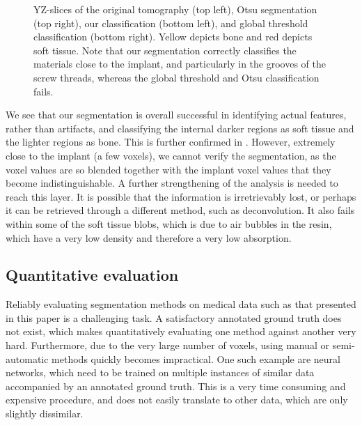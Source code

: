 \begin{figure}
\begin{tabular}{cc}
    \end{tabular}
    \caption{
	YZ-slices of the original tomography (top left), Otsu segmentation (top
	right), our classification (bottom left), and global threshold
	classification (bottom right).  Yellow depicts bone and red depicts
	soft tissue. Note that our segmentation correctly classifies the
	materials close to the implant, and particularly in the grooves of the
	screw threads, whereas the global threshold and Otsu classification
	fails.
    }
    \label{fig:histology-comparison2}
\end{figure}

We see that our segmentation is overall successful in identifying actual
features, rather than artifacts, and classifying the internal darker regions as
soft tissue and the lighter regions as bone. This is further confirmed in
. However, extremely close to the implant (a few
voxels), we cannot verify the segmentation, as the voxel values are so blended
together with the implant voxel values that they become indistinguishable. A
further strengthening of the analysis is needed to reach this layer. It is
possible that the information is irretrievably lost, or perhaps it can be
retrieved through a different method, such as deconvolution.  It also fails
within some of the soft tissue blobs, which is due to air bubbles in the resin,
which have a very low density and therefore a very low absorption.

\subsection{Quantitative evaluation}

Reliably evaluating segmentation methods on medical data such as that
presented in this paper is a challenging task. A satisfactory annotated ground
truth does not exist, which makes quantitatively evaluating one method against
another very hard. Furthermore, due to the very large number of voxels, using
manual or semi-automatic methods quickly becomes impractical. One such example
are neural networks, which need to be trained on multiple instances of similar
data accompanied by an annotated ground truth. This is a very time consuming
and expensive procedure, and does not easily translate to other data, which are
only slightly dissimilar.


